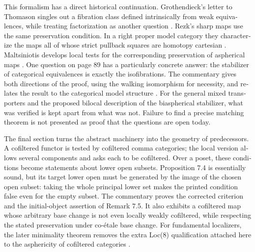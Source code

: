 \begin{otherlanguage}{english}
This formalism has a direct historical continuation. Grothendieck's letter
to Thomason singles out a fibration class defined intrinsically from weak
equivalences, while treating factorization as another question
\citep[\S1, pp.~3--4]{Grothendieck1991Letter}. Rezk's sharp maps use the same
preservation condition. In a right proper model category they characterize
the maps all of whose strict pullback squares are homotopy cartesian
\citep[Propositions 2.2 and 2.7]{Rezk1998Sharp}. Maltsiniotis develops local
tests for the corresponding preservation of aspherical maps
\citep[Definition 4.6 and Theorem 4.13]{Maltsiniotis2005Asphericite}.
One question on page 89 has a particularly concrete answer: the stabilizer
of categorical equivalences is exactly the isofibrations. The commentary gives
both directions of the proof, using the walking isomorphism for necessity,
and relates the result to the categorical model structure
\citep[\S2 and Theorem 3.1]{Rezk1996Categories}. For the general mixed
transporters and the proposed bilocal description of the biaspherical
stabilizer, what was verified is kept apart from what was not. Failure to find
a precise matching theorem is not presented as proof that the questions
are open today.

The final section turns the abstract machinery into the geometry of
predecessors. A cofiltered functor is tested by cofiltered comma categories;
the local version allows several components and asks each to be
cofiltered. Over a poset, these conditions become statements about lower
open subsets. Proposition 7.4 is essentially sound, but its target lower
open must be generated by the image of the chosen open subset: taking the
whole principal lower set makes the printed condition false even for the
empty subset. The commentary proves the corrected criterion and the
initial-object assertion of Remark 7.5. It also exhibits a cofiltered map
whose arbitrary base change is not even locally weakly cofiltered, while
respecting the stated preservation under co-étale base change. For
fundamental localizers, the later minimality theorem removes the extra
Loc(8) qualification attached here to the asphericity of cofiltered
categories \citep[Theorem 2.2.11]{Cisinski2004Minimal}.


\end{otherlanguage}
